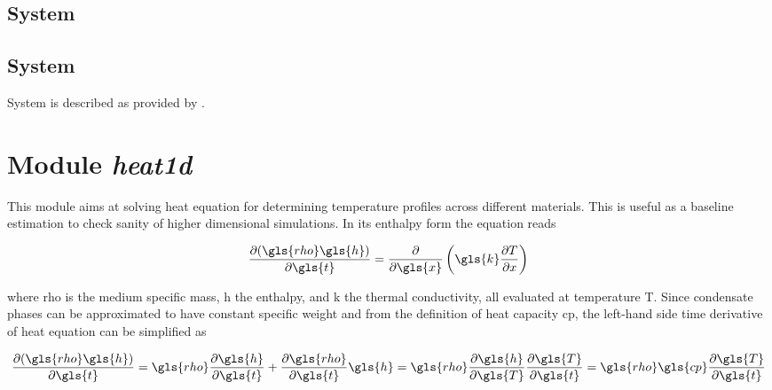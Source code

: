 \documentclass[12pt]{article}%
\begin{document}

\subsection{System }

\subsection{System }

System  is described as provided by \cite{Hillert1990}.


\section{Module \emph{heat1d}}

This module aims at solving heat equation for determining temperature profiles across different materials. This is useful as a baseline estimation to check sanity of higher dimensional simulations. In its enthalpy form the equation reads

\begin{equation}
\partialdiff{(\gls{rho}\gls{h})}{\gls{t}} =
\partialdiff{}{\gls{x}}\left(\gls{k}\partialdiff{T}{x}\right)
\label{eq:heat-equation-1d}
\end{equation}

\noindent{}where \gls{rho} is the medium specific mass, \gls{h} the enthalpy, and \gls{k} the thermal conductivity, all evaluated at temperature \gls{T}. Since condensate phases can be approximated to have constant specific weight and from the definition of heat capacity \gls{cp}, the left-hand side time derivative of heat equation can be simplified as

\begin{equation}
\partialdiff{(\gls{rho}\gls{h})}{\gls{t}} =
\gls{rho}\partialdiff{\gls{h}}{\gls{t}} + \partialdiff{\gls{rho}}{\gls{t}}\gls{h} =
\gls{rho}\partialdiff{\gls{h}}{\gls{T}}\partialdiff{\gls{T}}{\gls{t}} =
\gls{rho}\gls{cp}\partialdiff{\gls{T}}{\gls{t}}
\end{equation}
\end{document}
